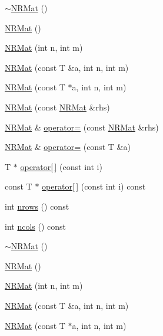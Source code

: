 \begin{DoxyCompactItemize}
\mbox{\hyperlink{classNR_1_1NRMat_a8b6826b7a7556a397ee7d7ad382e5dae}{$\sim$\+N\+R\+Mat}} ()
\item 
\mbox{\hyperlink{classNR_1_1NRMat_abcaca2687429fc0f26cde34647f7c981}{N\+R\+Mat}} ()
\item 
\mbox{\hyperlink{classNR_1_1NRMat_a52799868d76fb74a2d73b8d8291a9215}{N\+R\+Mat}} (int n, int m)
\item 
\mbox{\hyperlink{classNR_1_1NRMat_a31a0ecf81920c576b25e3c49bfa5e444}{N\+R\+Mat}} (const T \&a, int n, int m)
\item 
\mbox{\hyperlink{classNR_1_1NRMat_a30ddcc485a9e735b1fafbb56022fdc3a}{N\+R\+Mat}} (const T $\ast$a, int n, int m)
\item 
\mbox{\hyperlink{classNR_1_1NRMat_a7ad1dc6f56c44d5d0a7b595d48206cfa}{N\+R\+Mat}} (const \mbox{\hyperlink{classNR_1_1NRMat}{N\+R\+Mat}} \&rhs)
\item 
\mbox{\hyperlink{classNR_1_1NRMat}{N\+R\+Mat}} \& \mbox{\hyperlink{classNR_1_1NRMat_aba1c1ba10bf1b6ae9c2b78273e575dc4}{operator=}} (const \mbox{\hyperlink{classNR_1_1NRMat}{N\+R\+Mat}} \&rhs)
\item 
\mbox{\hyperlink{classNR_1_1NRMat}{N\+R\+Mat}} \& \mbox{\hyperlink{classNR_1_1NRMat_a6a8155b47cfdfb634440ad6600120087}{operator=}} (const T \&a)
\item 
T $\ast$ \mbox{\hyperlink{classNR_1_1NRMat_a387bf9be7d9606ea60e697c31c73df53}{operator\mbox{[}$\,$\mbox{]}}} (const int i)
\item 
const T $\ast$ \mbox{\hyperlink{classNR_1_1NRMat_a260aec593a5ef0c2166f6f4816ddfd2c}{operator\mbox{[}$\,$\mbox{]}}} (const int i) const
\item 
int \mbox{\hyperlink{classNR_1_1NRMat_aacebd802ca3dea0e0079a8dd27f7102c}{nrows}} () const
\item 
int \mbox{\hyperlink{classNR_1_1NRMat_ad6c5ecfb47d80c934bedeb7ea395fd84}{ncols}} () const
\item 
\mbox{\hyperlink{classNR_1_1NRMat_a8b6826b7a7556a397ee7d7ad382e5dae}{$\sim$\+N\+R\+Mat}} ()
\item 
\mbox{\hyperlink{classNR_1_1NRMat_abcaca2687429fc0f26cde34647f7c981}{N\+R\+Mat}} ()
\item 
\mbox{\hyperlink{classNR_1_1NRMat_a52799868d76fb74a2d73b8d8291a9215}{N\+R\+Mat}} (int n, int m)
\item 
\mbox{\hyperlink{classNR_1_1NRMat_a31a0ecf81920c576b25e3c49bfa5e444}{N\+R\+Mat}} (const T \&a, int n, int m)
\item 
\mbox{\hyperlink{classNR_1_1NRMat_a30ddcc485a9e735b1fafbb56022fdc3a}{N\+R\+Mat}} (const T $\ast$a, int n, int m)

\end{DoxyCompactItemize}
